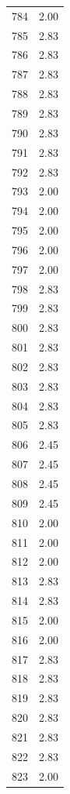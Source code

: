 \documentclass[a4paper,11pt]{article}
\begin{document}
\begin{center}
\begin{longtable}{|R{1.5cm}|R{2.5cm}|}
  784  &         2.00 \\ 
  785  &         2.83 \\ 
  786  &         2.83 \\ 
  787  &         2.83 \\ 
  788  &         2.83 \\ 
  789  &         2.83 \\ 
  790  &         2.83 \\ 
  791  &         2.83 \\ 
  792  &         2.83 \\ 
  793  &         2.00 \\ 
  794  &         2.00 \\ 
  795  &         2.00 \\ 
  796  &         2.00 \\ 
  797  &         2.00 \\ 
  798  &         2.83 \\ 
  799  &         2.83 \\ 
  800  &         2.83 \\ 
  801  &         2.83 \\ 
  802  &         2.83 \\ 
  803  &         2.83 \\ 
  804  &         2.83 \\ 
  805  &         2.83 \\ 
  806  &         2.45 \\ 
  807  &         2.45 \\ 
  808  &         2.45 \\ 
  809  &         2.45 \\ 
  810  &         2.00 \\ 
  811  &         2.00 \\ 
  812  &         2.00 \\ 
  813  &         2.83 \\ 
  814  &         2.83 \\ 
  815  &         2.00 \\ 
  816  &         2.00 \\ 
  817  &         2.83 \\ 
  818  &         2.83 \\ 
  819  &         2.83 \\ 
  820  &         2.83 \\ 
  821  &         2.83 \\ 
  822  &         2.83 \\ 
  823  &         2.00 \\ 

\end{longtable}
\end{center}
\end{document}
